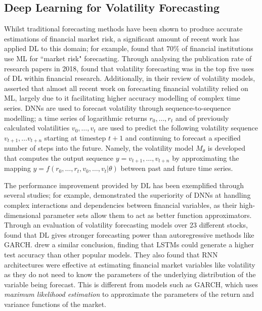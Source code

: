 \documentclass[a4paper, 11pt]{report}
\begin{document}
    \subsection{Deep Learning for Volatility Forecasting}

    Whilst traditional forecasting methods have been shown to produce accurate estimations of financial market risk, a significant amount of recent work has applied DL to this domain; for example, \citet{chartis-2019} found that $70\%$ of financial institutions use ML for ``market risk" forecasting. Through analysing the publication rate of research papers in 2018, \citet{sezer-2019} found that volatility forecasting was in the top five uses of DL within financial research. Additionally, in their review of volatility models, \citet{ge-2022} asserted that almost all recent work on forecasting financial volatility relied on ML, largely due to it facilitating higher accuracy modelling of complex time series. DNNs are used to forecast volatility through sequence-to-sequence modelling; a time series of logarithmic returns $r_0, \dots, r_t$ and of previously calculated volatilities $v_0, \dots, v_t$ are used to predict the following volatility sequence $v_{t+1}, \ldots v_{t+n}$ starting at timestep $t+1$ and continuing to forecast a specified number of steps into the future. Namely, the volatility model $M_{\theta}$ is developed that computes the output sequence $y = v_{t+1}, \dots, v_{t+n}$ by approximating the mapping $y = f( r_0, \dots, r_t, v_0, \dots, v_t \lvert \theta )$ between past and future time series.
    
    The performance improvement provided by DL has been exemplified through several studies; for example, \citet{zhang-2022} demonstrated the superiority of DNNs at handling complex interactions and dependencies between financial variables, as their high-dimensional parameter sets allow them to act as better function approximators. Through an evaluation of volatility forecasting models over 23 different stocks, \citet{rahimikia-2020} found that DL gives stronger forecasting power than autoregressive methods like GARCH. \citet{rodikov-2022} drew a similar conclusion, finding that LSTMs could generate a higher test accuracy than other popular models. They also found that RNN architectures were effective at estimating financial market variables like volatility as they do not need to know the parameters of the underlying distribution of the variable being forecast. This is different from models such as GARCH, which uses \emph{maximum likelihood estimation} to approximate the parameters of the return and variance functions of the market.
\end{document}

